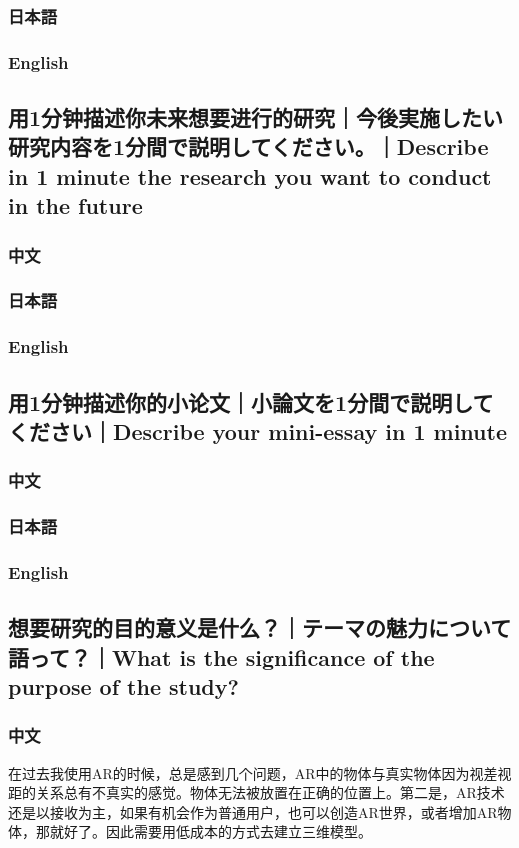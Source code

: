 \documentclass[lang=cn,11pt,a4paper]{elegantpaper}
\begin{document}
\subsubsection{日本語}
\subsubsection{English}

\subsection{用1分钟描述你未来想要进行的研究｜今後実施したい研究内容を1分間で説明してください。｜Describe in 1 minute the research you want to conduct in the future}
\subsubsection{中文}
\subsubsection{日本語}
\subsubsection{English}

\subsection{用1分钟描述你的小论文｜小論文を1分間で説明してください｜Describe your mini-essay in 1 minute}
\subsubsection{中文}
\subsubsection{日本語}
\subsubsection{English}

\subsection{想要研究的目的意义是什么？｜テーマの魅力について語って？｜What is the significance of the purpose of the study?}
\subsubsection{中文}
在过去我使用AR的时候，总是感到几个问题，AR中的物体与真实物体因为视差视距的关系总有不真实的感觉。物体无法被放置在正确的位置上。第二是，AR技术还是以接收为主，如果有机会作为普通用户，也可以创造AR世界，或者增加AR物体，那就好了。因此需要用低成本的方式去建立三维模型。
\end{document}
